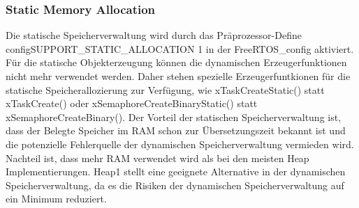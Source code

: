 \subsubsection{Static Memory Allocation}
Die statische Speicherverwaltung wird durch das Prä\-pro\-zes\-sor-Define configSUPPORT\_STATIC\_ALLOCATION 1 in der FreeRTOS\_config aktiviert. Für die statische Objekterzeugung können die dynamischen Erzeugerfunktionen nicht mehr verwendet werden. Daher stehen spezielle Erzeugerfuntkionen für die statische Speicherallozierung zur Verfügung, wie xTaskCreateStatic() statt xTaskCreate() oder xSemaphoreCreateBinaryStatic() statt xSemaphoreCreateBinary(). Der Vorteil der statischen Speicherverwaltung ist, dass der Belegte Speicher im RAM schon zur Übersetzungszeit bekannt ist und die potenzielle Fehlerquelle der dynamischen Speicherverwaltung vermieden wird. Nachteil ist, dass mehr RAM verwendet wird als bei den meisten Heap Implementierungen. Heap1 stellt eine geeignete Alternative in der dynamischen Speicherverwaltung, da es die Risiken der dynamischen Speicherverwaltung auf ein Minimum reduziert.   

      
